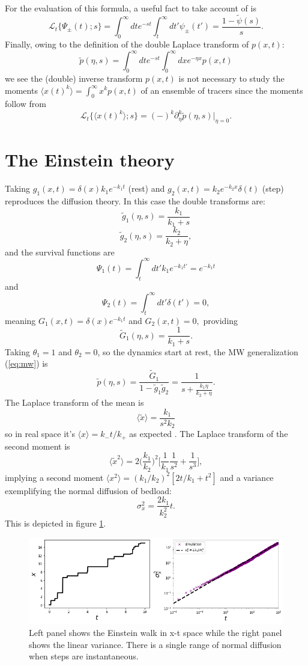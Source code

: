 \documentclass[11pt]{article}
\newcommand\be{\begin{equation}} %
\newcommand\ee{\end{equation}}   %
\newcommand\bra{\langle}
\newcommand\ket{\rangle}
\newcommand\El{\mathcal{L}}
\newcommand\tg{\tilde{g}}
\newcommand\tG{\tilde{G}}
\begin{document}
For the evaluation of this formula, a useful fact to take account of is 
\be \El_t\{ \Psi_\pm(t);s\} = \int_0^\infty dt e^{-st} \int_t^\infty dt' \psi_\pm(t') = \frac{1-\tilde{\psi}(s)}{s}. \ee
Finally, owing to the definition of the double Laplace transform of $p(x,t)$:
\be \tilde{p}(\eta,s) = \int_0^\infty dt e^{-st} \int_0^\infty dx e^{-\eta x} p(x,t)\ee
we see the (double) inverse transform $p(x,t)$ is not necessary to study the moments $\bra x(t)^k \ket = \int_0^\infty x^k p(x,t)$ of an ensemble of tracers since the moments follow from
\be \El_t\{\bra x(t)^k\ket;s\} = (-)^k\partial_\eta^k \tilde{p}(\eta,s)\Big|_{\eta=0}.\ee

\section{The Einstein theory}
Taking $g_1(x,t) = \delta(x)k_1 e^{-k_1t}$ (rest) and $g_2(x,t) = k_2 e^{-k_2 x}\delta(t) $ (step) reproduces the \citet{Einstein1937} diffusion theory.
In this case the double transforms are: 
\be \tilde{g}_1(\eta,s) = \frac{k_1}{k_1+s}\ee
\be \tilde{g}_2(\eta,s) = \frac{k_2}{k_2+\eta}, \ee
and the survival functions are 
\be \Psi_1(t) = \int_t^\infty dt' k_1e^{-k_1 t'} = e^{-k_1 t} \ee
and 
\be \Psi_2(t) = \int_t^\infty dt' \delta(t') = 0 ,  \ee
meaning $G_1(x,t) = \delta(x) e^{-k_1 t}$ and $G_2(x,t) = 0,$ providing
\be \tG_1(\eta,s) = \frac{1}{k_1+s}.\ee
Taking $\theta_1=1$ and $\theta_2=0$, so the dynamics start at rest, the MW generalization (\ref{eq:mw}) is
\be \tilde{p}(\eta, s) = \frac{\tG_1}{1-\tg_1\tg_2} = \frac{1}{s + \frac{k_1 \eta}{k_2 + \eta }}.\label{eq:mwgen}\ee
The Laplace transform of the mean is 
\be \bra \tilde{x} \ket = \frac{k_1}{s^2 k_2}
\ee
so in real space it's $\bra x \ket = k_- t/k_+$ as expected \citep[e.g.][]{Einstein1937, Nakagawa1976}.
The Laplace transform of the second moment is 
\be\bra \tilde{x}^2 \ket = 2\Big(\frac{k_1}{k_2}\Big)^2 \Big[ \frac{1}{k_1}\frac{1}{s^2} + \frac{1}{s^3}\Big], \ee
implying a second moment $\bra x^2 \ket = (k_1/k_2)^2[2t/k_1+t^2] $
and a variance exemplifying the normal diffusion of bedload:
\be \sigma_x^2 = \frac{2k_1}{k_2^2}t.\ee
This is depicted in figure \ref{fig:einwalk}.
\begin{figure}[h]
	\centering
	\includegraphics[width=\linewidth,keepaspectratio]{combo0.png}
	\caption{Left panel shows the Einstein walk in x-t space while the right panel shows the linear variance. There is a single range of normal diffusion when steps are instantaneous.}
	\label{fig:einwalk}
\end{figure}
\end{document}
